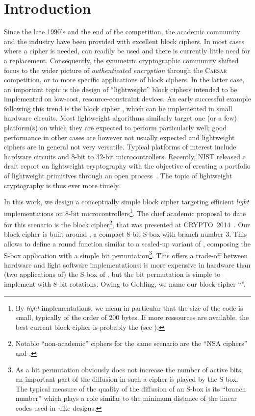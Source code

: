 \section{Introduction}
Since the late 1990's and the end of the \aes competition, the academic community and the industry have been provided with excellent block ciphers.
In most cases where a cipher is needed, \aes \cite{rijndael} can readily be used and there is currently little need for a replacement.
Consequently, the symmetric cryptographic community shifted focus to \eg the wider picture of \emph{authenticated encryption} through
the \textsc{Caesar} competition, or to more specific applications of block ciphers. In the latter case, an important topic is
the design of ``lightweight'' block ciphers intended to be implemented on low-cost, resource-constraint devices. An early
successful example following this trend is the block cipher \present \cite{present}, which can be implemented in small hardware circuits.
Most lightweight algorithms similarly target one (or a few) platform(s) on which they are expected to perform particularly well;
good performance in other cases are however not usually expected and lightweight ciphers are in general not very versatile.
Typical platforms of interest include hardware circuits and 8-bit to 32-bit microcontrollers.
Recently, NIST released a draft report on lightweight cryptography with the objective of creating a portfolio of lightweight primitives
through an open process~\cite{NistLightDraft}. The topic of lightweight cryptography is thus ever more timely. 

In this work, we design a conceptually simple block cipher targeting efficient \emph{light} implementations on 8-bit microcontrollers\footnote{By \emph{light} implementations,
we mean in particular that the size of the code is small, typically of the order of 200 bytes. If more ressources are available, the best current block cipher is
probably the \aes (see \eg \cite{DBLP:journals/iacr/BeaulieuSSTWW15}).}.
The chief academic proposal to date for this scenario is the \pride block cipher\footnote{Notable
``non-academic'' ciphers for the same scenario are the ``NSA ciphers'' \simon and \speck \cite{NSAciph}.},
that was presented at CRYPTO~2014~\cite{pride}. Our block cipher is built around \littlunOne, a compact 8-bit S-box with branch number 3. This allows
to define a round function similar to a scaled-up variant of \present, composing the S-box application with a simple bit permutation\footnote{As a bit permutation
obviously does not increase the number of active bits, an important part of the diffusion in such a cipher is played by the S-box. The typical measure of the quality
of the diffusion of an S-box is its ``branch number'' which plays a role similar to the minimum distance of the linear codes used in \aes-like designs.}.
This offers a trade-off between hardware and light software implementations: \littlunOne is more expensive in hardware than (two applications
of) the S-box of \present, but the bit permutation is simple to implement with 8-bit rotations. Owing to Golding, we name our
block cipher ``\fly''.

